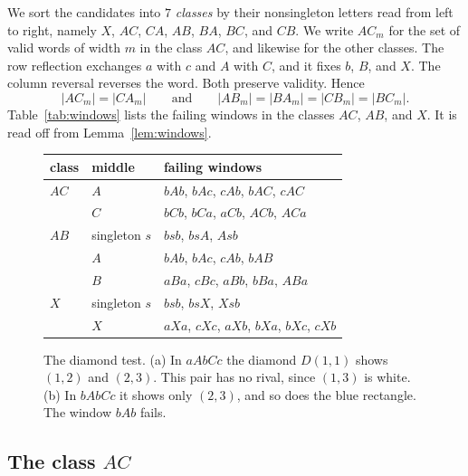 We sort the candidates into $7$ \emph{classes} by their nonsingleton letters
read from left to right, namely $X$, $AC$, $CA$, $AB$, $BA$, $BC$, and $CB$. We
write $AC_m$ for the set of valid words of width $m$ in the class $AC$, and
likewise for the other classes. The row reflection exchanges $a$ with $c$ and
$A$ with $C$, and it fixes $b$, $B$, and $X$. The column reversal reverses the
word. Both preserve validity. Hence
\begin{equation}\label{eq:classsym}
|AC_m|=|CA_m|\qquad\text{and}\qquad|AB_m|=|BA_m|=|CB_m|=|BC_m| .
\end{equation}
Table~\ref{tab:windows} lists the failing windows in the classes $AC$, $AB$, and
$X$. It is read off from Lemma~\ref{lem:windows}.

\begin{figure}[t]
\begin{minipage}[b]{0.5\textwidth}
\centering\footnotesize
\begin{tabular}{@{}lll@{}}
\toprule
class & middle & failing windows \\
\midrule
$AC$ & $A$ & $bAb$, $bAc$, $cAb$, $bAC$, $cAC$ \\
 & $C$ & $bCb$, $bCa$, $aCb$, $ACb$, $ACa$ \\
\midrule
$AB$ & singleton $s$ & $bsb$, $bsA$, $Asb$ \\
 & $A$ & $bAb$, $bAc$, $cAb$, $bAB$ \\
 & $B$ & $aBa$, $cBc$, $aBb$, $bBa$, $ABa$ \\
\midrule
$X$ & singleton $s$ & $bsb$, $bsX$, $Xsb$ \\
 & $X$ & $aXa$, $cXc$, $aXb$, $bXa$, $bXc$, $cXb$ \\
\bottomrule
\end{tabular}
\label{tab:windows}
\end{minipage}\hfill
\begin{minipage}[b]{0.46\textwidth}
\centering
\resizebox{\textwidth}{!}{}
\caption{The diamond test. (a) In $aAbCc$ the diamond $D(1,1)$ shows $(1,2)$
and $(2,3)$. This pair has no rival, since $(1,3)$ is white. (b) In $bAbCc$ it
shows only $(2,3)$, and so does the blue rectangle. The window $bAb$ fails.}
\label{fig:diamond}
\end{minipage}
\end{figure}

\subsection{\texorpdfstring{The class $AC$}{The class AC}}


